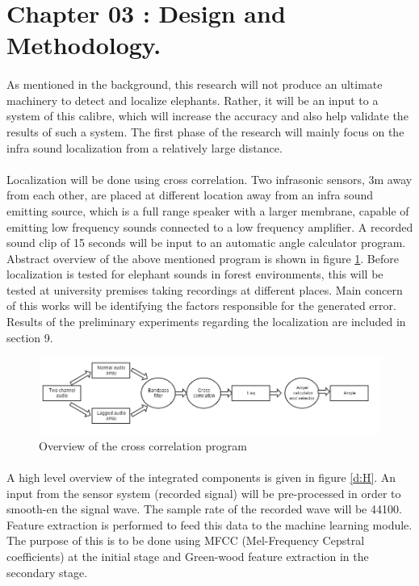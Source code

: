 \documentclass[11pt]{article}
\numberwithin{figure}{section}
\numberwithin{table}{section}
\begin{document}
\newpage
\section*{Chapter 03 : Design and Methodology.}
\paragraph{}
As mentioned in the background, this research will not produce an ultimate machinery to detect and  localize elephants. Rather, it will be an input to a system of this calibre, which will increase the accuracy and also help validate the results of such a system. The first phase of the research will mainly focus on the infra sound localization from a relatively large distance.

\paragraph{}
Localization will be done using cross correlation. Two infrasonic sensors, 3m away from each other, are placed at different location away from an infra sound emitting source, which is a full range speaker with a larger membrane, capable of emitting low frequency sounds connected to a low frequency amplifier. A recorded sound clip of 15 seconds will be input to an automatic angle calculator program. Abstract overview of the above mentioned program is shown in figure \ref{d:anglecal}. Before localization is tested for elephant sounds in  forest environments, this will be tested at university premises taking recordings at different places. Main concern of this works will be identifying the factors responsible for the generated error. Results of the preliminary experiments regarding the localization are included in section 9.

\begin{figure}[h]
\centering
\includegraphics[width= \textwidth]{anglecal.png}
\caption{Overview of the cross correlation program}
\label{d:anglecal}
\end{figure}

\paragraph{}
A high level overview of the integrated components is given in figure \ref{d:H}. An input from the sensor system (recorded signal) will be pre-processed in order to smooth-en the signal wave. The sample rate of the recorded wave will be 44100. Feature extraction is performed to feed this data to the machine learning module. The purpose of this is to be done using MFCC (Mel-Frequency Cepstral coefficients) at the initial stage and Green-wood feature extraction in the secondary stage. 
\end{document}
